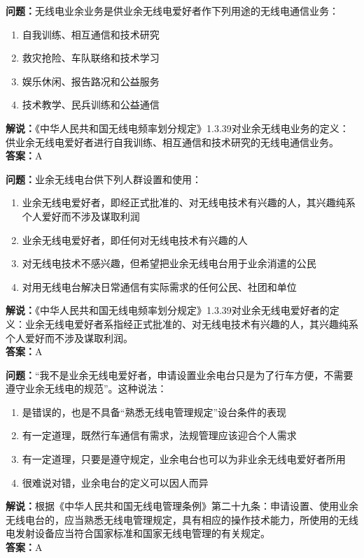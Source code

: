 \textbf{问题：}无线电业余业务是供业余无线电爱好者作下列用途的无线电通信业务：
\begin{enumerate}[label=\Alph*), leftmargin=3em]
	\item 自我训练、相互通信和技术研究
	\item 救灾抢险、车队联络和技术学习
	\item 娱乐休闲、报告路况和公益服务
	\item 技术教学、民兵训练和公益通信
\end{enumerate}
\textbf{解说：}《中华人民共和国无线电频率划分规定》1.3.39对业余无线电业务的定义：供业余无线电爱好者进行自我训练、相互通信和技术研究的无线电通信业务。\\
\textbf{答案：}A

\textbf{问题：}业余无线电台供下列人群设置和使用：
\begin{enumerate}[label=\Alph*), leftmargin=3em]
	\item 业余无线电爱好者，即经正式批准的、对无线电技术有兴趣的人，其兴趣纯系个人爱好而不涉及谋取利润
	\item 业余无线电爱好者，即任何对无线电技术有兴趣的人
	\item 对无线电技术不感兴趣，但希望把业余无线电台用于业余消遣的公民
	\item 对用无线电台解决日常通信有实际需求的任何公民、社团和单位
\end{enumerate}
\textbf{解说：}《中华人民共和国无线电频率划分规定》1.3.39对业余无线电爱好者的定义：业余无线电爱好者系指经正式批准的、对无线电技术有兴趣的人，其兴趣纯系个人爱好而不涉及谋取利润。\\
\textbf{答案：}A

\textbf{问题：}“我不是业余无线电爱好者，申请设置业余电台只是为了行车方便，不需要遵守业余无线电的规范”。这种说法：
\begin{enumerate}[label=\Alph*), leftmargin=3em]
	\item 是错误的，也是不具备“熟悉无线电管理规定”设台条件的表现
	\item 有一定道理，既然行车通信有需求，法规管理应该迎合个人需求
	\item 有一定道理，只要是遵守规定，业余电台也可以为非业余无线电爱好者所用
	\item 很难说对错，业余电台的定义可以因人而异
\end{enumerate}
\textbf{解说：}根据《中华人民共和国无线电管理条例》第二十九条：申请设置、使用业余无线电台的，应当熟悉无线电管理规定，具有相应的操作技术能力，所使用的无线电发射设备应当符合国家标准和国家无线电管理的有关规定。\\
\textbf{答案：}A

